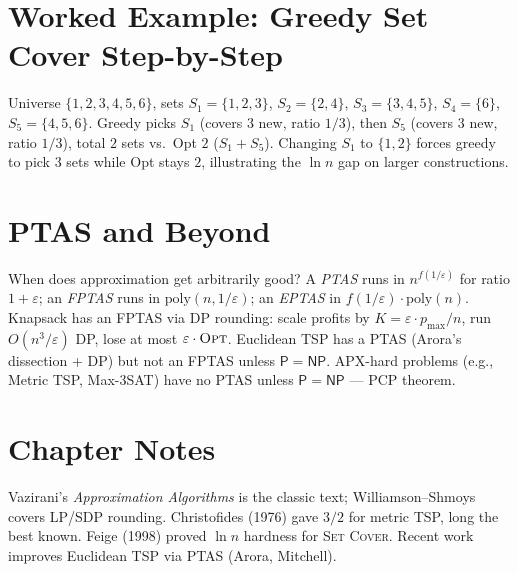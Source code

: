 \section{Worked Example: Greedy Set Cover Step-by-Step}
\label{sec:sc-example}

Universe $\{1,2,3,4,5,6\}$, sets $S_1=\{1,2,3\}$, $S_2=\{2,4\}$, $S_3=\{3,4,5\}$, $S_4=\{6\}$, $S_5=\{4,5,6\}$. Greedy picks $S_1$ (covers $3$ new, ratio $1/3$), then $S_5$ (covers $3$ new, ratio $1/3$), total $2$ sets vs.\ Opt $2$ ($S_1+S_5$). Changing $S_1$ to $\{1,2\}$ forces greedy to pick $3$ sets while Opt stays $2$, illustrating the $\ln n$ gap on larger constructions.

\section{PTAS and Beyond}
\label{sec:ptas}

When does approximation get arbitrarily good? A \emph{PTAS} runs in $n^{f(1/\varepsilon)}$ for ratio $1+\varepsilon$; an \emph{FPTAS} runs in $\text{poly}(n,1/\varepsilon)$; an \emph{EPTAS} in $f(1/\varepsilon)\cdot\text{poly}(n)$. Knapsack has an FPTAS via DP rounding: scale profits by $K=\varepsilon\cdot p_{\max}/n$, run $O(n^3/\varepsilon)$ DP, lose at most $\varepsilon\cdot\textsc{Opt}$. Euclidean TSP has a PTAS (Arora's dissection + DP) but not an FPTAS unless $\mathsf{P}=\mathsf{NP}$. APX-hard problems (e.g., Metric TSP, Max-3SAT) have no PTAS unless $\mathsf{P}=\mathsf{NP}$ --- PCP theorem.

\section{Chapter Notes}
Vazirani's \emph{Approximation Algorithms} is the classic text; Williamson--Shmoys covers LP/SDP rounding. Christofides (1976) gave $3/2$ for metric TSP, long the best known. Feige (1998) proved $\ln n$ hardness for \textsc{Set Cover}. Recent work improves Euclidean TSP via PTAS (Arora, Mitchell).


